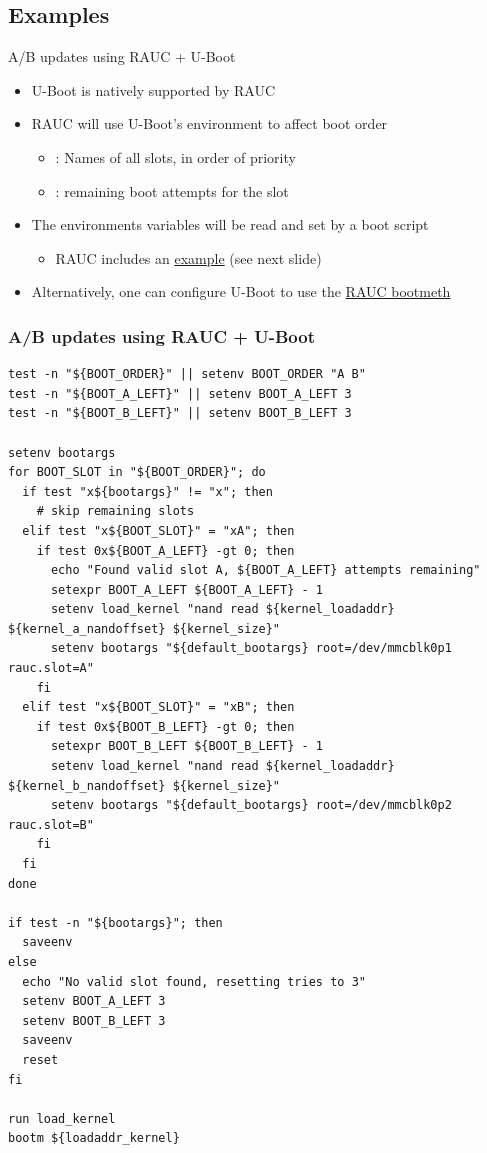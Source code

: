 \subsection{Examples}

\begin{frame}{A/B updates using RAUC + U-Boot}
  \begin{itemize}
    \item U-Boot is natively supported by RAUC
    \item RAUC will use U-Boot's environment to affect boot order
    \begin{itemize}
      \item {}: Names of all slots, in order of priority
      \item {}: remaining boot attempts for the slot
    \end{itemize}
    \item The environments variables will be read and set by a
          boot script
    \begin{itemize}
	    \item RAUC includes an \href{https://github.com/rauc/rauc/blob/master/contrib/uboot.sh}{example}
            (see next slide)
    \end{itemize}
    \item Alternatively, one can configure U-Boot to use the
          \href{https://docs.u-boot.org/en/latest/develop/bootstd/rauc.html}{RAUC bootmeth}
  \end{itemize}
\end{frame}

\begin{frame}[fragile]
  \frametitle{A/B updates using RAUC + U-Boot}
  \begin{verbatim}
test -n "${BOOT_ORDER}" || setenv BOOT_ORDER "A B"
test -n "${BOOT_A_LEFT}" || setenv BOOT_A_LEFT 3
test -n "${BOOT_B_LEFT}" || setenv BOOT_B_LEFT 3

setenv bootargs
for BOOT_SLOT in "${BOOT_ORDER}"; do
  if test "x${bootargs}" != "x"; then
    # skip remaining slots
  elif test "x${BOOT_SLOT}" = "xA"; then
    if test 0x${BOOT_A_LEFT} -gt 0; then
      echo "Found valid slot A, ${BOOT_A_LEFT} attempts remaining"
      setexpr BOOT_A_LEFT ${BOOT_A_LEFT} - 1
      setenv load_kernel "nand read ${kernel_loadaddr} ${kernel_a_nandoffset} ${kernel_size}"
      setenv bootargs "${default_bootargs} root=/dev/mmcblk0p1 rauc.slot=A"
    fi
  elif test "x${BOOT_SLOT}" = "xB"; then
    if test 0x${BOOT_B_LEFT} -gt 0; then
      setexpr BOOT_B_LEFT ${BOOT_B_LEFT} - 1
      setenv load_kernel "nand read ${kernel_loadaddr} ${kernel_b_nandoffset} ${kernel_size}"
      setenv bootargs "${default_bootargs} root=/dev/mmcblk0p2 rauc.slot=B"
    fi
  fi
done

if test -n "${bootargs}"; then
  saveenv
else
  echo "No valid slot found, resetting tries to 3"
  setenv BOOT_A_LEFT 3
  setenv BOOT_B_LEFT 3
  saveenv
  reset
fi

run load_kernel
bootm ${loadaddr_kernel}
  \end{verbatim}
\end{frame}


